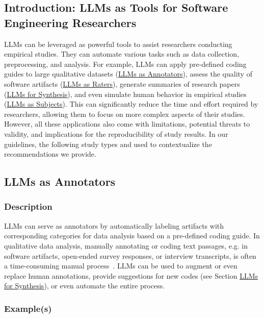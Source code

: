 



\subsection{Introduction: LLMs as Tools for Software Engineering Researchers}

LLMs can be leveraged as powerful tools to assist researchers conducting empirical studies.
They can automate various tasks such as data collection, preprocessing, and analysis.
For example, LLMs can apply pre-defined coding guides to large qualitative datasets (\href{/study-types/#llms-as-annotators}{LLMs as Annotators}), assess the quality of software artifacts (\href{/study-types/#llms-as-raters}{LLMs as Raters}), generate summaries of research papers (\href{/study-types/#llms-for-synthesis}{LLMs for Synthesis}), and even simulate human behavior in empirical studies (\href{/study-types/#llms-as-subjects}{LLMs as Subjects}).
This can significantly reduce the time and effort required by researchers, allowing them to focus on more complex aspects of their studies.
However, all these applications also come with limitations, potential threats to validity, and implications for the reproducibility of study results.
In our guidelines, the following study types and used to contextualize the recommendations we provide.


\subsection{LLMs as Annotators}

\subsubsection{Description}

LLMs can serve as annotators by automatically labeling artifacts with corresponding categories for data analysis based on a pre-defined coding guide.
In qualitative data analysis, manually annotating or coding text passages, e.g. in software artifacts, open-ended survey responses, or interview transcripts, is often a time-consuming manual process~\cite{DBLP:journals/ase/BanoHZT24}.
LLMs can be used to augment or even replace human annotations, provide suggestions for new codes (see Section \href{/study-types/#llms-for-synthesis}{LLMs for Synthesis}), or even automate the entire process.

\subsubsection{Example(s)}

